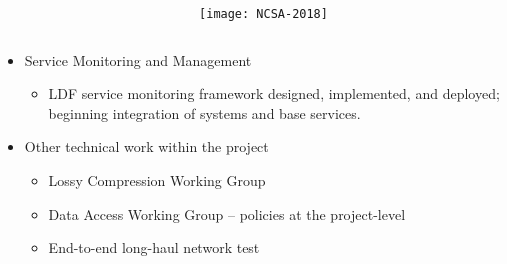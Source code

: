 {\begin{columns}
\begin{column}{0.6\textwidth}
\begin{itemize}
\begin{itemize}
	\end{itemize}
\end{itemize}
\end{column}
\begin{column}{0.4\textwidth}
\texttt{[image: NCSA-2018]}
\end{column}
\end{columns}


\begin{itemize}

\item Service Monitoring and Management

\begin{itemize}
    \item LDF service monitoring framework designed, implemented, and deployed; beginning integration of systems and base services.

\end{itemize}
\item Other technical work within the project

	\begin{itemize}
    \item Lossy Compression Working Group
    \item Data Access Working Group -- policies at the project-level
    \item End-to-end long-haul network test
	\end{itemize}
\end{itemize}
}


